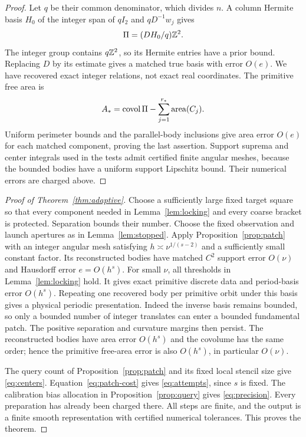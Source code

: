 \begin{proof}
Let $q$ be their common denominator, which divides $n$. A column
Hermite basis $H_0$ of the integer span of $qI_2$ and $qD^{-1}w_j$
gives
\begin{equation}\label{eq:period-basis}
                         \Pi=(DH_0/q)\mathbb Z^2.
\end{equation}
The integer group contains $q\mathbb Z^2$, so its Hermite entries have a
prior bound. Replacing $D$ by its estimate gives a matched true basis
with error $O(e)$. We have recovered exact integer relations, not
exact real coordinates. The primitive free area is
\[
             A_* =\operatorname{covol}\Pi-\sum_{j=1}^{r_*}\operatorname{area}(C_j).
\]
Uniform perimeter bounds and the parallel-body inclusions give area
error $O(e)$ for each matched component, proving the last assertion.
Support suprema and center integrals used in the tests admit certified
finite angular meshes, because the bounded bodies have a uniform
support Lipschitz bound. Their numerical errors are charged above.
\end{proof}

\begin{proof}[Proof of Theorem~\ref{thm:adaptive}]
Choose a sufficiently large fixed target square so that every component
needed in Lemma~\ref{lem:locking} and every coarse bracket is protected.
Separation bounds their number. Choose the fixed observation and launch
apertures as in Lemma~\ref{lem:stopped}. Apply
Proposition~\ref{prop:patch} with an integer angular mesh satisfying
$h\asymp\nu^{1/(s-2)}$ and a sufficiently small constant factor.
Its reconstructed bodies have matched $C^2$ support error $O(\nu)$
and Hausdorff error $e=O(h^s)$. For small $\nu$, all thresholds in
Lemma~\ref{lem:locking} hold. It gives exact primitive discrete data
and period-basis error $O(h^s)$. Repeating one recovered body per
primitive orbit under this basis gives a physical periodic presentation.
Indeed the inverse basis remains bounded, so only a bounded number of
integer translates can enter a bounded fundamental patch. The positive
separation and curvature margins then persist. The reconstructed
bodies have area error $O(h^s)$ and the covolume has the same order;
hence the primitive free-area error is also $O(h^s)$, in particular
$O(\nu)$.

The query count of Proposition~\ref{prop:patch} and its fixed local
stencil size give \eqref{eq:centers}. Equation~\eqref{eq:patch-cost}
gives \eqref{eq:attempts}, since $s$ is fixed. The calibration bias
allocation in Proposition~\ref{prop:query} gives \eqref{eq:precision}.
Every preparation has already been charged there. All steps are finite,
and the output is a finite smooth representation with certified
numerical tolerances. This proves the theorem.
\end{proof}


